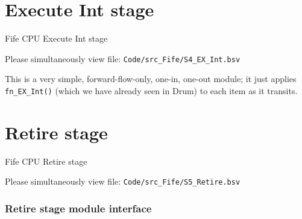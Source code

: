
\section{Execute Int stage}

\begin{frame}[fragile]

\begin{center}
  {\LARGE Fife CPU Execute Int stage}

  \vspace{10ex}

  Please simultaneously view file: \hm \verb|Code/src_Fife/S4_EX_Int.bsv|
\end{center}

\vspace{5ex}

This is a very simple, forward-flow-only, one-in, one-out module; it
 just applies \verb|fn_EX_Int()| (which we have already seen in Drum)
 to each item as it transits.

\end{frame}


\section{Retire stage}

\begin{frame}[fragile]

\begin{center}
  {\LARGE Fife CPU Retire stage}

  \vspace{10ex}

  Please simultaneously view file: \hm \verb|Code/src_Fife/S5_Retire.bsv|
\end{center}

\end{frame}


\begin{frame}[fragile]
\frametitle{Retire stage module interface}

\footnotesize

\begin{minipage}{0.725\textwidth}
\end{minipage}

\end{frame}

